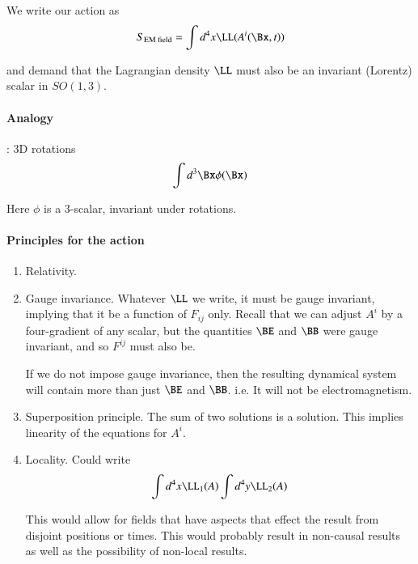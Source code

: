 We write our action as
%
\begin{equation}\label{eqn:relativisticElectrodynamicsL12b:170}
S_{\text{EM field}} = \int d^4 x \LL(A^i(\Bx, t))
\end{equation}

and demand that the Lagrangian density \(\LL\) must also be an invariant (Lorentz) scalar in \(SO(1,3)\).
%
\paragraph{Analogy}: 3D rotations
%
\begin{equation}\label{eqn:relativisticElectrodynamicsL12b:190}
\int d^3 \Bx \phi(\Bx)
\end{equation}

Here \(\phi\) is a 3-scalar, invariant under rotations.
%
\paragraph{Principles for the action}

\begin{enumerate}
\item Relativity.
\item Gauge invariance.  Whatever \(\LL\) we write, it must be gauge invariant, implying that it be a function of \(F_{ij}\) only.  Recall that we can adjust \(A^i\) by a four-gradient of any scalar, but the quantities \(\BE\) and \(\BB\) were gauge invariant, and so \(F^{ij}\) must also be.

If we do not impose gauge invariance, then the resulting dynamical system will contain more than just \(\BE\) and \(\BB\).  i.e. It will not be electromagnetism.

\item Superposition principle.  The sum of two solutions is a solution.  This implies linearity of the equations for \(A^i\).

\item Locality.  Could write
%
\begin{equation}\label{eqn:relativisticElectrodynamicsL12b:210}
\int d^4 x \LL_1(A) \int d^4 y \LL_2(A)
\end{equation}

This would allow for fields that have aspects that effect the result from disjoint positions or times.  This would probably result in non-causal results as well as the possibility of non-local results.
\end{enumerate}

